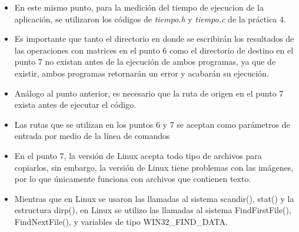 \documentclass[12pt]{article}
\begin{document}
\begin{itemize}
             \item[\Checkmark] En este mismo punto, para la medición del tiempo de ejecucion de la aplicación, se utilizaron los códigos de \textit{tiempo.h} y \textit{tiempo.c} de la práctica 4.
            
            \item[\Checkmark] Es importante que tanto el directorio en donde se escribirán los resultados de las operaciones con matrices en el punto 6 como el directorio de destino en el punto 7 no existan antes de la ejecución de ambos programas, ya que de existir, ambos programas retornarán un error y acabarán su ejecución.
            
            \item[\Checkmark] Análogo al punto anterior, es necesario que la ruta de origen en el punto 7 exista antes de ejecutar el código.
            
            \item[\Checkmark] Las rutas que se utilizan en los puntos 6 y 7 se aceptan como parámetros de entrada por medio de la línea de comandos
            
             \item[\Checkmark] En el punto 7, la versión de Linux acepta todo tipo de archivos para copiarlos, sin embargo, la versión de Linux tiene problemas con las imágenes, por lo que únicamente funciona con archivos que contienen texto.
             
              \item[\Checkmark] Mientras que en Linux se usaron las llamadas al sistema scandir(), stat() y la estructura dirp(), en Linux se utilizo las llamadas al sistema FindFirstFile(), FindNextFile(), y variables de tipo WIN32\_FIND\_DATA.
             
            
            
            
            
            
        \end{itemize}
        
        


	
\end{document}
